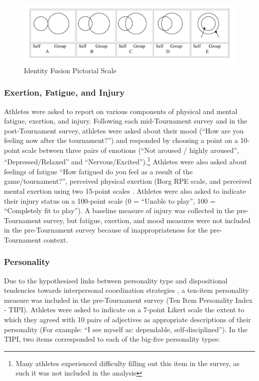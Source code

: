 \begin{figure}[htbp]
  \includegraphics[width=\linewidth]{images/Identity_Fusion_Pictorial_Scale.png}
  \caption{Identity Fusion Pictorial Scale}
  \label{fig:fusionPictorialGroup}
\end{figure}


\subsubsection{Exertion, Fatigue, and Injury}
Athletes were asked to report on various components of physical and mental fatigue, exertion, and injury.  Following each mid-Tournament survey and in the post-Tournament survey, athletes were asked about their mood (``How are you feeling now after the tournament?'') and responded by choosing a point on a 10-point scale between three pairs of emotions (``Not aroused / highly aroused'',  ``Depressed/Relaxed'' and  ``Nervous/Excited'').\footnote{Many athletes experienced difficulty filling out this item in the survey, as such it was not included in the analysis} Athletes were also asked about feelings of fatigue ``How fatigued do you feel as a result of the game/tournament?'', perceived physical exertion (Borg RPE scale, \citep{Borg1990} and perceived mental exertion using two 15-point scales \citep[see][ ]{Noakes2012a}.  Athletes were also asked to indicate their injury status on a 100-point scale (0 = ``Unable to play'', 100 = ``Completely fit to play'').  A baseline measure of injury was  collected in the pre-Tournament survey, but fatigue, exertion, and mood measures were not included in the pre-Tournament survey because of inappropriateness for the pre-Tournament context.





\subsubsection{Personality}
Due to the hypothesised links between personality type and dispositional tendencies towards interpersonal coordination strategies \citep{Marsh2009}, a ten-item personality measure was included in the pre-Tournament survey (Ten Item Personality Index - TIPI)\citep{Gosling2003}. Athletes were asked to indicate on a 7-point Likert scale the extent to which they agreed with 10 pairs of adjectives as appropriate descriptions of their personality (For example: ``I see myself as: dependable, self-disciplined''). In the TIPI, two items corresponded to each of the big-five personality types:

